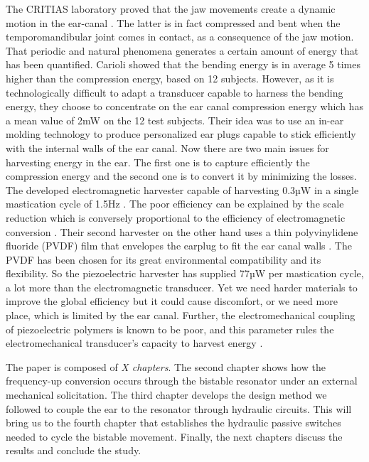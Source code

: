 \documentclass[3p,twocolumn,preprint]{elsarticle}
\begin{document}
The CRITIAS laboratory proved that the jaw movements create a dynamic motion in the ear-canal \cite{Carioli2016}. The latter is in fact compressed and bent when the temporomandibular joint comes in contact, as a consequence of the jaw motion. That periodic and natural phenomena generates a certain amount of energy that has been quantified. Carioli showed that the bending energy is in average 5 times higher than the compression energy, based on 12 subjects. However, as it is technologically difficult to adapt a transducer capable to harness the bending energy, they choose to concentrate on the ear canal compression energy which has a mean value of 2mW on the 12 test subjects. Their idea was to use an in-ear molding technology to produce personalized ear plugs capable to stick efficiently with the internal walls of the ear canal. Now there are two main issues for harvesting energy in the ear. The first one is to capture efficiently the compression energy and the second one is to convert it by minimizing the losses.\\
The developed electromagnetic harvester capable of harvesting 0.3µW in a single mastication cycle of 1.5Hz \cite{Delnavaz2012}. The poor efficiency can be explained by the scale reduction which is conversely proportional to the efficiency of electromagnetic conversion \cite{Arnold2007}. Their second harvester on the other hand uses a thin polyvinylidene fluoride (PVDF) film that envelopes the earplug to fit the ear canal walls \cite{Delnavaz2013}. The PVDF has been chosen for its great environmental compatibility and its flexibility. So the piezoelectric harvester has supplied 77µW per mastication cycle, a lot more than the electromagnetic transducer. Yet we need harder materials to improve the global efficiency but it could cause discomfort, or we need more place, which is limited by the ear canal. Further, the electromechanical coupling of piezoelectric polymers is known to be poor, and this parameter rules the electromechanical transducer’s capacity to harvest energy \cite{Roundy2005}.


The paper is composed of \emph{X chapters}. The second chapter shows how the frequency-up conversion occurs through the bistable resonator under an external mechanical solicitation. The third chapter develops the design method we followed to couple the ear to the resonator through hydraulic circuits. This will bring us to the fourth chapter that establishes the hydraulic passive switches needed to cycle the bistable movement. Finally, the next chapters discuss the results and conclude the study.
\end{document}
